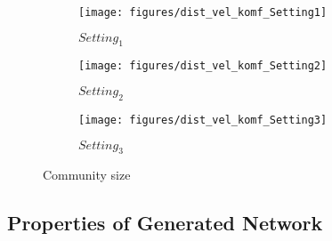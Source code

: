 \begin{figure}[ht]
	\centering
  \begin{subfigure}{2.7cm}
    \centering\texttt{[image: figures/dist\_vel\_komf\_Setting1]}
    \caption{$Setting_1$}
  \end{subfigure}
  \begin{subfigure}{2.7cm}
    \centering\texttt{[image: figures/dist\_vel\_komf\_Setting2]}
    \caption{$Setting_2$}
		  \end{subfigure}
   \begin{subfigure}{2.7cm}
    \centering\texttt{[image: figures/dist\_vel\_komf\_Setting3]}
    \caption{$Setting_3$}
  \end{subfigure}
	\caption{Community size}
\label{fig:ComSize}
\end{figure}


\subsection{Properties of Generated Network}

